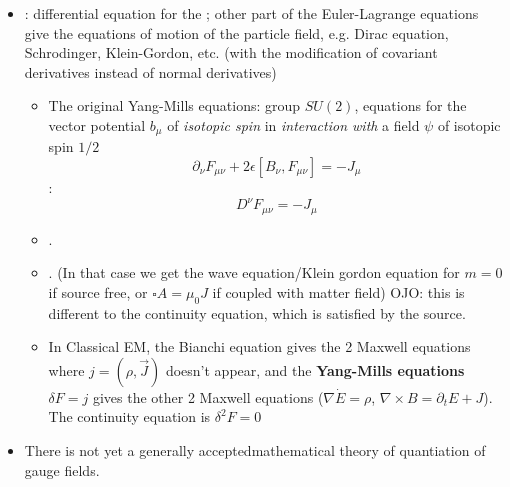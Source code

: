 \begin{itemize}
    \item {}: differential equation for the ; other part of the Euler-Lagrange equations give the equations of motion of the particle field, e.g. Dirac equation, Schrodinger, Klein-Gordon, etc. (with the modification of covariant derivatives instead of normal derivatives)
    \begin{itemize}
        \item The original Yang-Mills equations: group $SU(2)$, equations for the vector potential $b_\mu$ of \emph{isotopic spin} in \emph{interaction with} a field $\psi$ of isotopic spin $1/2$ \[\partial_\nu F_{\mu \nu} + 2 \epsilon [B_\nu, F_{\mu \nu}] = -J_\mu\] :\[D^\nu F_{\mu \nu} = -J_\mu\] 
        
        \item {}.
        
        \item {}. (In that case we get the wave equation/Klein gordon equation for $m=0$ if source free, or $\square A = \mu_0 J$ if coupled with matter field) OJO: this is different to the continuity equation, which is satisfied by the source.
        
        \item In Classical EM, the Bianchi equation gives the 2 Maxwell equations where $j = (\rho, \vec J)$ doesn't appear, and the \textbf{Yang-Mills equations} $\delta F = j$ gives the other 2 Maxwell equations ($\nabla \dot E = \rho$, $\nabla \times B = \partial_t E + J$). The continuity equation is $\delta^2 F = 0$
    \end{itemize}
    
    \item There is not yet a generally acceptedmathematical theory of quantiation of gauge fields.
\end{itemize}

